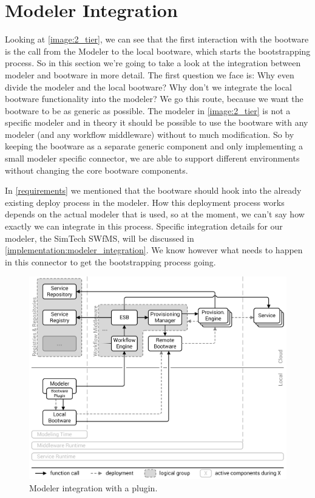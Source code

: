 \section{Modeler Integration}
\label{eclipse}

Looking at \autoref{image:2_tier}, we can see that the first interaction with the bootware is the call from the Modeler to the local bootware, which starts the bootstrapping process.
So in this section we're going to take a look at the integration between modeler and bootware in more detail.
The first question we face is: Why even divide the modeler and the local bootware?
Why don't we integrate the local bootware functionality into the modeler?
We go this route, because we want the bootware to be as generic as possible.
The modeler in \autoref{image:2_tier} is not a specific modeler and in theory it should be possible to use the bootware with any modeler (and any workflow middleware) without to much modification.
So by keeping the bootware as a separate generic component and only implementing a small modeler specific connector, we are able to support different environments without changing the core bootware components.

In \autoref{requirements} we mentioned that the bootware should hook into the already existing deploy process in the modeler.
How this deployment process works depends on the actual modeler that is used, so at the moment, we can't say how exactly we can integrate in this process.
Specific integration details for our modeler, the SimTech SWfMS, will be discussed in \autoref{implementation:modeler_integration}.
We know however what needs to happen in this connector to get the bootstrapping process going.

\begin{figure}[!htbp]
	\centering
	\includegraphics[resolution=600]{design/assets/modeler_plugin}
	\caption{Modeler integration with a plugin.}
	\label{image:modeler_plugin}
\end{figure}

